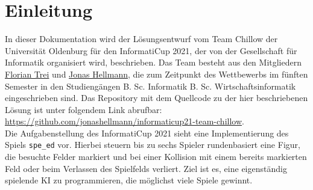 \chapter{Einleitung}
\label{ch:einleitung}

In dieser Dokumentation wird der Lösungsentwurf vom Team Chillow der Universität Oldenburg für den InformatiCup 2021,
der von der Gesellschaft für Informatik organisiert wird, beschrieben.
Das Team besteht aus den Mitgliedern \href{https://github.com/Florian3007}{Florian Trei} und
\href{https://jonas-hellmann.de}{Jonas Hellmann}, die zum Zeitpunkt des Wettbewerbs im fünften Semester in den
Studiengängen B. Sc. Informatik \bzw B. Sc. Wirtschaftsinformatik eingeschrieben sind.
Das Repository mit dem Quellcode zu der hier beschriebenen Lösung ist unter folgendem Link abrufbar:
\url{https://github.com/jonashellmann/informaticup21-team-chillow}. \\

Die Aufgabenstellung des InformatiCup 2021  sieht eine Implementierung des Spiels
\texttt{spe\_ed} vor.
Hierbei steuern bis zu sechs Spieler rundenbasiert eine Figur, die besuchte Felder markiert und bei einer Kollision
mit einem bereits markierten Feld oder beim Verlassen des Spielfelds verliert.
Ziel ist es, eine eigenständig spielende \ac{KI} zu programmieren, die möglichst viele Spiele gewinnt.